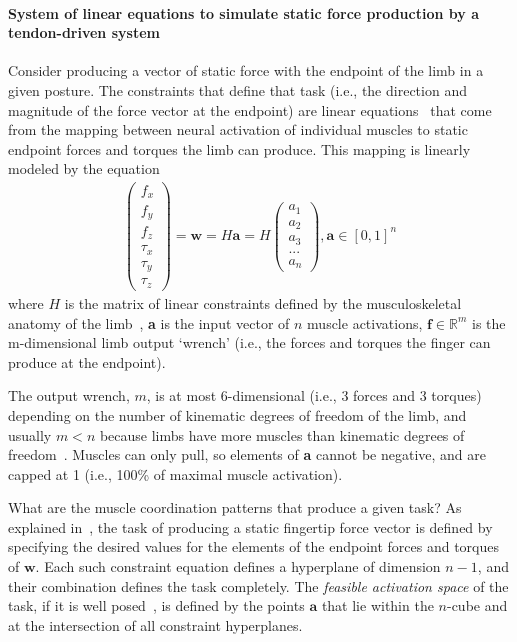 \documentclass[9pt,twocolumn,twoside,lineno]{pnas-new}
\begin{document}
{\paragraph*{System of linear equations to simulate static force production by a tendon-driven system}

Consider producing a vector of static force with the endpoint of the limb in a given posture. The constraints that define that task (i.e., the direction and magnitude of the force vector at the endpoint) are linear equations~\cite{valero-cuevas2015fundamentals} that come from the mapping between neural activation of individual muscles to static endpoint forces and torques the limb can produce. This mapping is linearly modeled by the equation
\begin{align}
\label{eq:constraints}
		 \begin{pmatrix}
f_{x}\\
f_{y}\\
f_{z}\\
\tau_{x}\\
\tau_{y}\\
\tau_{z}
\end{pmatrix}=\textbf{w} = H\textbf{a} = H\begin{pmatrix}
a_{1}\\
a_{2}\\
a_{3}\\
...\\
a_{n}
\end{pmatrix}
, \textbf{a} \in [0,1]^n
\end{align}
where $H$ is the matrix of linear constraints defined by the musculoskeletal anatomy of the limb~\cite{Valero-Cuevas2015high-dimensional}, \textbf{a} is the input vector of $n$ muscle activations, $\textbf{f} \in \mathbb{R}^m$ is the m-dimensional limb output `wrench' (i.e., the forces and torques the finger can produce at the endpoint).

The output wrench, $m$, is at most 6-dimensional (i.e., 3 forces and 3 torques) depending on the number of kinematic degrees of freedom of the limb, and usually $m < n$ because limbs have more muscles than kinematic degrees of freedom~\cite{valero-cuevas2015fundamentals}. Muscles can only pull, so elements of \textbf{a} cannot be negative, and are capped at 1 (i.e., 100\% of maximal muscle activation).

What are the muscle coordination patterns that produce a given task? As explained in~\cite{valero-cuevas2015fundamentals}, the task of producing a static fingertip force vector is defined by specifying the desired values for the elements of the endpoint forces and torques of $\textbf{w}$. Each such constraint equation defines a hyperplane of dimension $n-1$, and their combination defines the task completely. The \emph{feasible activation space} of the task, if it is well posed~\cite{chvatal1983linear}, is defined by the points $\textbf{a}$ that lie within the $n$-cube and at the intersection of all constraint hyperplanes.

}
\end{document}
